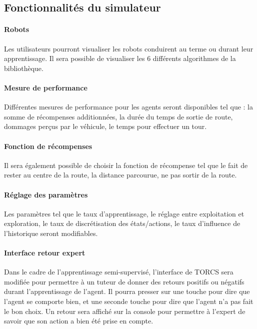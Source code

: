 \documentclass[a4paper,12pt]{article}
\begin{document}
	\subsection{Fonctionnalités du simulateur}
		\paragraph{Robots} Les utilisateurs pourront visualiser les robots conduirent au terme ou durant leur
		apprentissage. Il sera possible de visualiser les 6 différents algorithmes de la bibliothèque.
		\paragraph{Mesure de performance} Différentes mesures de performance pour les agents seront disponibles
		tel que : la somme de récompenses additionnées, la durée du temps de sortie de route, dommages perçus par  
                le véhicule, le temps pour effectuer un tour.
		\paragraph{Fonction de récompenses} Il sera également possible de choisir la fonction de récompense 
		tel que le fait de rester au centre de la route, la distance parcourue, ne pas sortir de la route.
		\paragraph{Réglage des paramètres} Les paramètres tel que le taux d'apprentissage, le réglage entre
		exploitation et exploration, le taux de discrétisation des états/actions, le taux d'influence
		de l'historique seront modifiables.
		\paragraph{Interface retour expert} Dans le cadre de l'apprentissage semi-supervisé, l'interface de TORCS
		sera modifiée pour permettre à un tuteur de donner des retours positifs ou négatifs durant l'apprentissage
		de l'agent. Il pourra presser sur une touche pour dire que l'agent se comporte bien,
		et une seconde touche pour dire que l'agent n'a pas fait le bon choix.
		Un retour sera affiché sur la console pour permettre à l'expert de savoir que son
		action a bien été prise en compte.
\end{document}
